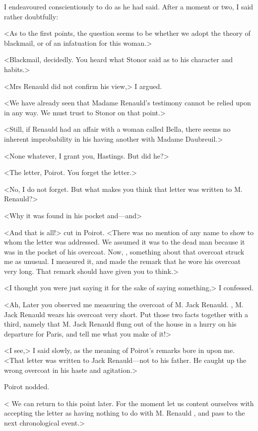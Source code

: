  I endeavoured conscientiously to do as he had said. After a moment or two, I said rather doubtfully: 

 <As to the first points, the question seems to be whether we adopt the theory of blackmail, or of an infatuation for this woman.> 

 <Blackmail, decidedly. You heard what Stonor said as to his character and habits.> 

 <Mrs Renauld did not confirm his view,> I argued. 

 <We have already seen that Madame Renauld's testimony cannot be relied upon in any way. We must trust to Stonor on that point.> 

 <Still, if Renauld had an affair with a woman called Bella, there seems no inherent improbability in his having another with Madame Daubreuil.> 

 <None whatever, I grant you, Hastings. But did he?> 

 <The letter, Poirot. You forget the letter.> 

 <No, I do not forget. But what makes you think that letter was written to M. Renauld?> 

 <Why it was found in his pocket and—and\longdash> 

 <And that is all!> cut in Poirot. <There was no mention of any name to show to whom the letter was addressed. We assumed it was to the dead man because it was in the pocket of his overcoat. Now, , something about that overcoat struck me as unusual. I measured it, and made the remark that he wore his overcoat very long. That remark should have given you to think.> 

 <I thought you were just saying it for the sake of saying something,> I confessed. 

 <Ah,  Later you observed me measuring the overcoat of M. Jack Renauld. , M. Jack Renauld wears his overcoat very short. Put those two facts together with a third, namely that M. Jack Renauld flung out of the house in a hurry on his departure for Paris, and tell me what you make of it!> 

 <I see,> I said slowly, as the meaning of Poirot's remarks bore in upon me. <That letter was written to Jack Renauld—not to his father. He caught up the wrong overcoat in his haste and agitation.> 

 Poirot nodded. 

 < We can return to this point later. For the moment let us content ourselves with accepting the letter as having nothing to do with M. Renauld , and pass to the next chronological event.> 

